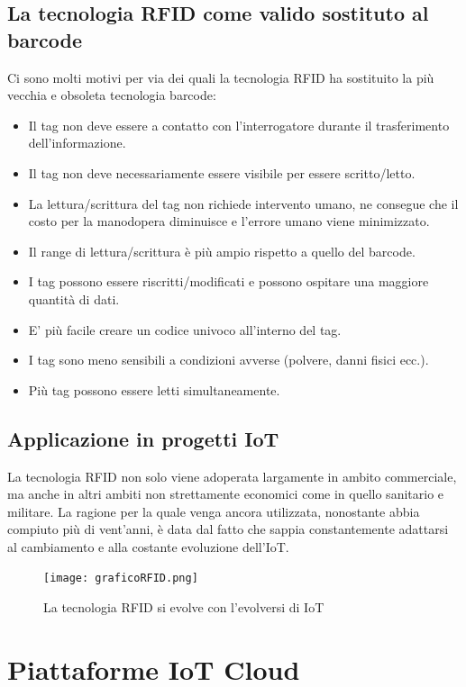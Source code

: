 \documentclass[a4paper,titlepage]{report}
\begin{document}
\section{La tecnologia RFID come valido sostituto al barcode}
Ci sono molti motivi per via dei quali la tecnologia RFID ha sostituito la più vecchia e obsoleta tecnologia barcode:
\begin{itemize}
\item Il tag non deve essere a contatto con l'interrogatore durante il trasferimento dell'informazione.
\item Il tag non deve necessariamente essere visibile per essere scritto/letto.
\item La lettura/scrittura del tag non richiede intervento umano, ne consegue che il costo per la manodopera diminuisce e l'errore umano viene minimizzato.
\item Il range di lettura/scrittura è più ampio rispetto a quello del barcode.
\item I tag possono essere riscritti/modificati e possono ospitare una maggiore quantità di dati.
\item E' più facile creare un codice univoco all'interno del tag.
\item I tag sono meno sensibili a condizioni avverse (polvere, danni fisici ecc.).
\item Più tag possono essere letti simultaneamente\cite{Kaur:RFIDTechnologyPrinciplesAdvantagesLimitationsApplications}.
\end{itemize}
\section{Applicazione in progetti IoT}
La tecnologia RFID non solo viene adoperata largamente in ambito commerciale, ma anche in altri ambiti non strettamente economici come in quello sanitario e militare. La ragione per la quale venga ancora utilizzata, nonostante abbia compiuto più di vent'anni, è data dal fatto che sappia constantemente adattarsi al cambiamento e alla costante evoluzione dell'IoT\cite{Xiaolin:RFIDTechnologyApplicationsIoT}.\\
\begin{figure}[h]
\centering
\texttt{[image: graficoRFID.png]}
\caption{La tecnologia RFID si evolve con l'evolversi di IoT}
\end{figure}

\chapter{Piattaforme IoT Cloud}
\end{document}
